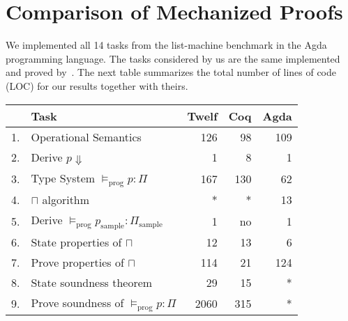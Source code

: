 \documentclass[sigconf]{acmart}
\theoremstyle{definition}
\begin{document}
\section{Comparison of Mechanized Proofs}\label{sec:comparison}

We implemented all 14 tasks from the list-machine benchmark in the Agda programming language.
The tasks considered by us are the same implemented and proved by~\citet{Appel07}.
The next table summarizes the total number of lines of code (LOC) for our results together with theirs. 

\begin{table}[!htb]
\begin{tabular}{rl|rrr}
    & Task                                         & \multicolumn{1}{l}{Twelf} & \multicolumn{1}{l}{Coq} & \multicolumn{1}{l}{Agda} \\ \hline
1.  & Operational Semantics                        & 126                       & 98                      & 109                      \\
2.  & Derive $p \Downarrow$                        & 1                         & 8                       & 1                        \\ \hline
3.  & Type System $\vDash_{\textrm{prog}} p : \Pi$ & 167                       & 130                     & 62                       \\
4.  & $\sqcap$ algorithm                           & *                         & *                       & 13                       \\
5.  & Derive $\vDash_{\textrm{prog}} p_{\textrm{sample}} : \Pi_{\textrm{sample}}$
                                                   & 1                         & no                      & 1                        \\
6.  & State properties of $\sqcap$                 & 12                        & 13                      & 6                        \\
7.  & Prove properties of $\sqcap$                 & 114                       & 21                      & 124                      \\
8.  & State soundness theorem                      & 29                        & 15                      & *                        \\
9.  & Prove soundness of $\vDash_{\textrm{prog}} p : \Pi$
                                                   & 2060                      & 315                     & *                        \\ \hline

\end{tabular}
\end{table}
\end{document}
